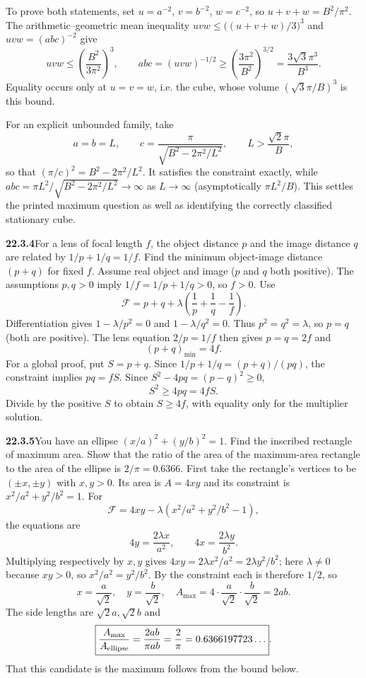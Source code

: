 To prove both statements, set $u=a^{-2}$, $v=b^{-2}$,
$w=c^{-2}$, so $u+v+w=B^2/\pi^2$. The arithmetic--geometric mean
inequality $uvw\le\bigl((u+v+w)/3\bigr)^3$ and $uvw=(abc)^{-2}$ give
\[
uvw\le\left(\frac{B^2}{3\pi^2}\right)^3,\qquad
abc=(uvw)^{-1/2}\ge\left(\frac{3\pi^2}{B^2}\right)^{3/2}
=\boxed{\frac{3\sqrt3\pi^3}{B^3}}.
\]
Equality occurs only at $u=v=w$, i.e. the cube, whose volume
$(\sqrt3\pi/B)^3$ is this bound.

For an explicit unbounded family, take
\[
a=b=L,\qquad
c=\frac{\pi}{\sqrt{B^2-2\pi^2/L^2}},
\qquad L>\frac{\sqrt2\pi}{B},
\]
so that $(\pi/c)^2=B^2-2\pi^2/L^2$.
It satisfies the constraint exactly, while
$abc=\pi L^2/\sqrt{B^2-2\pi^2/L^2}\to\infty$ as $L\to\infty$
(asymptotically $\pi L^2/B$).
This settles the printed maximum question as well as identifying
the correctly classified stationary cube.


\par\bigskip
\noindent\textbf{22.3.4}\quad For a lens of focal length $f$, the
object distance $p$ and the image distance $q$ are related by
$1/p+1/q=1/f$. Find the minimum object-image distance $(p+q)$
for fixed $f$. Assume real object and image ($p$ and $q$ both
positive).
\solution
The assumptions $p,q>0$ imply $1/f=1/p+1/q>0$, so $f>0$. Use
\[
\mathcal F=p+q+\lambda\left(\frac1p+\frac1q-\frac1f\right).
\]
Differentiation gives $1-\lambda/p^2=0$ and
$1-\lambda/q^2=0$. Thus $p^2=q^2=\lambda$, so $p=q$ (both are positive).
The lens equation $2/p=1/f$ then gives $p=q=2f$ and
\[
\boxed{(p+q)_{\min}=4f}.
\]
For a global proof, put $S=p+q$. Since $1/p+1/q=(p+q)/(pq)$, the
constraint implies $pq=fS$. Since $S^2-4pq=(p-q)^2\ge0$,
\[
S^2\ge4pq=4fS.
\]
Divide by the positive $S$ to obtain $S\ge4f$, with equality only
for the multiplier solution.


\par\bigskip
\noindent\textbf{22.3.5}\quad You have an ellipse
$(x/a)^{2}+(y/b)^{2}=1$. Find the inscribed rectangle of maximum
area. Show that the ratio of the area of the maximum-area
rectangle to the area of the ellipse is $2/\pi=0.6366$.
\solution
First take the rectangle's vertices to be $(\pm x,\pm y)$ with
$x,y>0$. Its area is $A=4xy$ and its constraint is
$x^2/a^2+y^2/b^2=1$. For
\[
\mathcal F=4xy-\lambda(x^2/a^2+y^2/b^2-1),
\]
the equations are
\[
4y=\frac{2\lambda x}{a^2},\qquad
4x=\frac{2\lambda y}{b^2}.
\]
Multiplying respectively by $x,y$ gives
$4xy=2\lambda x^2/a^2=2\lambda y^2/b^2$; here $\lambda\ne0$ because
$xy>0$, so $x^2/a^2=y^2/b^2$. By the constraint each is therefore
$1/2$, so
\[
\boxed{x=\frac a{\sqrt2},\quad y=\frac b{\sqrt2},\quad
A_{\max}=4\cdot\frac a{\sqrt2}\cdot\frac b{\sqrt2}=2ab}.
\]
The side lengths are $\sqrt2a,\sqrt2b$ and
\[
\boxed{\frac{A_{\max}}{A_{\rm ellipse}}
=\frac{2ab}{\pi ab}=\frac2\pi=0.6366197723\ldots}.
\]
That this candidate is the maximum follows from the bound below.

